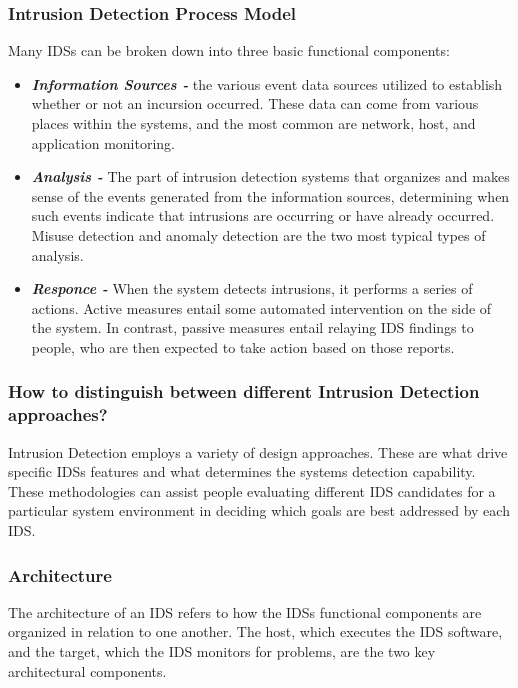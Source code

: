 \documentclass[12pt]{article}
\begin{document}
    \subsubsection{Intrusion Detection Process Model}
    \par Many IDSs can be broken down into three basic functional components:
    \begin{itemize}
        \item\textbf{\textit{Information Sources - }}the various event data sources utilized to establish whether or not an incursion occurred. These data can come from various places within the systems, and the most common are network, host, and application monitoring.
        \item \textbf{\textit{Analysis - }}The part of intrusion detection systems that organizes and makes sense of the events generated from the information sources, determining when such events indicate that intrusions are occurring or have already occurred. Misuse detection and anomaly detection are the two most typical types of analysis.
        \item \textbf{\textit{Responce - }}When the system detects intrusions, it performs a series of actions. Active measures entail some automated intervention on the side of the system. In contrast, passive measures entail relaying IDS findings to people, who are then expected to take action based on those reports.
    \end{itemize}

    \subsubsection{How to distinguish between different Intrusion Detection approaches?}
    \par Intrusion Detection employs a variety of design approaches. These are what drive specific IDSs features and what determines the systems detection capability. These methodologies can assist people evaluating different IDS candidates for a particular system environment in deciding which goals are best addressed by each IDS.
    \\
    
    \subsubsection{Architecture}
    \par The architecture of an IDS refers to how the IDSs functional components are organized in relation to one another. The host, which executes the IDS software, and the target, which the IDS monitors for problems, are the two key architectural components.
    \\
    
\end{document}
